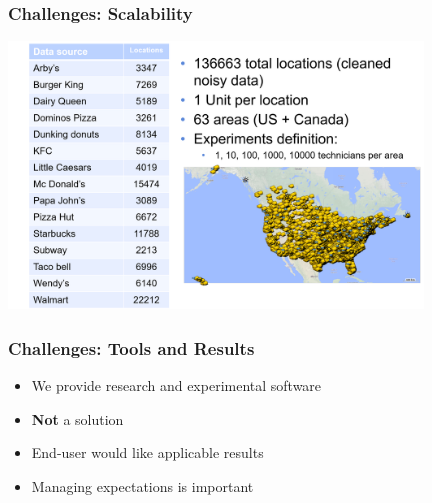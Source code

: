 \begin{frame}
\frametitle{Challenges: Scalability}
\includegraphics[width=11cm]{imagesfieldservice/simulatorscalability}
\end{frame}

\begin{frame}
\frametitle{Challenges: Tools and Results}
\begin{itemize}
\item We provide research and experimental software
\item \textbf{Not} a solution
\item End-user would like applicable results
\item Managing expectations is important
\end{itemize}
\end{frame}



